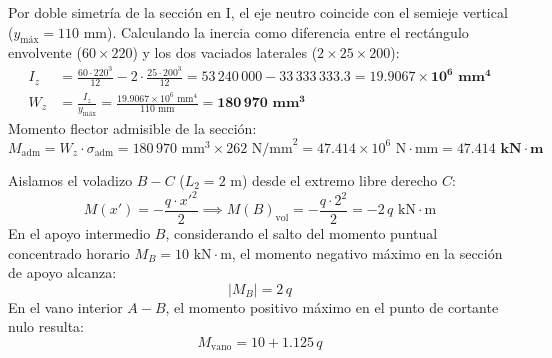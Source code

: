 {    Por doble simetría de la sección en I, el eje neutro coincide con el semieje vertical ($y_{\text{máx}} = 110\text{ mm}$).
    Calculando la inercia como diferencia entre el rectángulo envolvente ($60 \times 220$) y los dos vaciados laterales ($2 \times 25 \times 200$):
    \begin{align}
        I_z       & = \frac{60 \cdot 220^3}{12} - 2 \cdot \frac{25 \cdot 200^3}{12} = 53\,240\,000 - 33\,333\,333.3 = \mathbf{19.9067 \times 10^6\text{ mm}^4} \\
        W_z       & = \frac{I_z}{y_{\text{máx}}} = \frac{19.9067 \times 10^6\text{ mm}^4}{110\text{ mm}} = \mathbf{180\,970\text{ mm}^3}
    \end{align}
    Momento flector admisible de la sección:
    \begin{equation}
        M_{\text{adm}} = W_z \cdot \sigma_{\text{adm}} = 180\,970\text{ mm}^3 \times 262\text{ N/mm}^2 = 47.414 \times 10^6\text{ N}\cdot\text{mm} = \mathbf{47.414\text{ kN}\cdot\text{m}}
    \end{equation}


    Aislamos el voladizo $B-C$ ($L_2 = 2\text{ m}$) desde el extremo libre derecho $C$:
    \begin{equation}
        M(x') = -\frac{q \cdot x'^2}{2} \implies M(B)_{\text{vol}} = -\frac{q \cdot 2^2}{2} = -2\,q\text{ kN}\cdot\text{m}
    \end{equation}
    En el apoyo intermedio $B$, considerando el salto del momento puntual concentrado horario $M_B = 10\text{ kN}\cdot\text{m}$, el momento negativo máximo en la sección de apoyo alcanza:
    \begin{equation}
        |M_B| = 2\,q
    \end{equation}
    En el vano interior $A-B$, el momento positivo máximo en el punto de cortante nulo resulta:
    \begin{equation}
        M_{\text{vano}} = 10 + 1.125\,q
    \end{equation}


}

